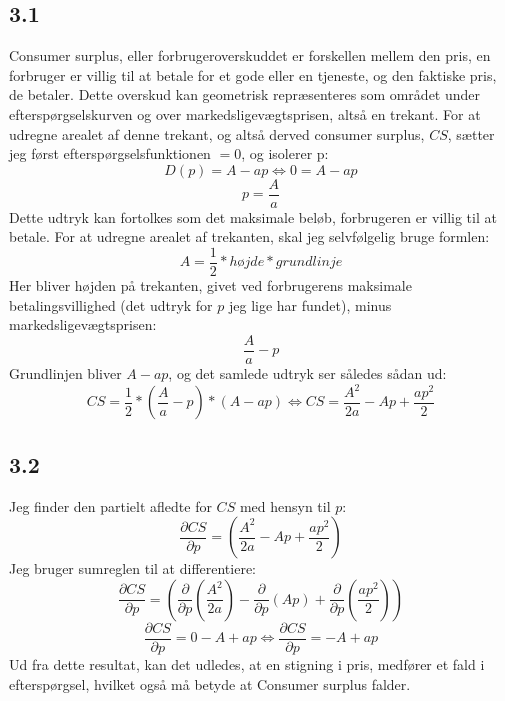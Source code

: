 \documentclass{article}
\begin{document}
\subsection*{3.1}
Consumer surplus, eller forbrugeroverskuddet er forskellen mellem den pris, en forbruger er villig til at betale for et gode eller en tjeneste, og den faktiske pris, de betaler. Dette overskud kan geometrisk repræsenteres som området under efterspørgselskurven og over markedsligevægtsprisen, altså en trekant. For at udregne arealet af denne trekant, og altså derved consumer surplus, $CS$, sætter jeg først efterspørgselsfunktionen $=0$, og isolerer p:
\begin{equation}
    D(p)=A-ap \Leftrightarrow 0=A-ap
\end{equation}
\begin{equation}
    p=\frac{A}{a}
\end{equation}
Dette udtryk kan fortolkes som det maksimale beløb, forbrugeren er villig til at betale. For at udregne arealet af trekanten, skal jeg selvfølgelig bruge formlen:
\begin{equation}
    A=\frac{1}{2}*højde*grundlinje
\end{equation}
Her bliver højden på trekanten, givet ved forbrugerens maksimale betalingsvillighed (det udtryk for $p$ jeg lige har fundet), minus markedsligevægtsprisen:
\begin{equation}
    \frac{A}{a}-p
\end{equation}
Grundlinjen bliver $A-ap$, og det samlede udtryk ser således sådan ud:
\begin{equation}
    CS=\frac{1}{2}*(\frac{A}{a}-p)*(A-ap) \Leftrightarrow CS=\frac{A^2}{2 a}-A p+\frac{a p^2}{2}
\end{equation}
\subsection*{3.2}
Jeg finder den partielt afledte for $CS$ med hensyn til $p$:
\begin{equation}
    \frac{\partial CS}{\partial p}= (\frac{A^2}{2 a}-A p+\frac{a p^2}{2})
\end{equation}
Jeg bruger sumreglen til at differentiere:
\begin{equation}
    \frac{\partial CS}{\partial p} =(\frac{\partial}{\partial p}\left(\frac{A^2}{2 a}\right)-\frac{\partial}{\partial p}(A p)+\frac{\partial}{\partial p}\left(\frac{a p^2}{2}\right))
\end{equation}
\begin{equation}
    \frac{\partial CS}{\partial p} = 0 - A + ap \Leftrightarrow \frac{\partial CS}{\partial p} = -A+ap
\end{equation}
Ud fra dette resultat, kan det udledes, at en stigning i pris, medfører et fald i efterspørgsel, hvilket også må betyde at Consumer surplus falder. 
\end{document}
